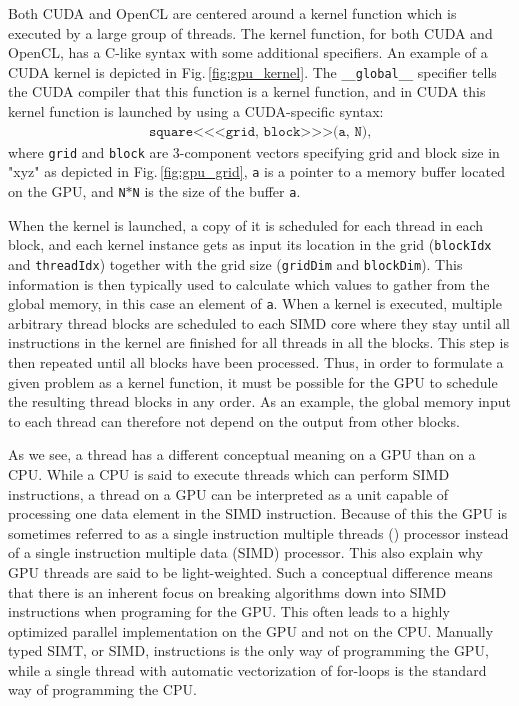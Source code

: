 Both CUDA and OpenCL are centered around a kernel function which is executed by a large group of threads. The kernel function, for both CUDA and OpenCL, has a C-like syntax with some additional specifiers. An example of a CUDA kernel is depicted in Fig.\,\ref{fig:gpu_kernel}. The \texttt{\_\_global\_\_} specifier tells the CUDA compiler that this function is a kernel function, and in CUDA this kernel function is launched by using a CUDA-specific syntax:
\begin{align*}
\texttt{square<<<grid, block>>>(a, N)},
\end{align*}
where \texttt{grid} and \texttt{block} are 3-component vectors specifying grid and block size in "xyz" as depicted in Fig.\,\ref{fig:gpu_grid}, \texttt{a} is a pointer to a memory buffer located on the GPU, and \texttt{N}$*$\texttt{N} is the size of the buffer \texttt{a}. 

When the kernel is launched, a copy of it is scheduled for each thread in each block, and each kernel instance gets as input its location in the grid (\texttt{blockIdx} and \texttt{threadIdx}) together with the grid size (\texttt{gridDim} and \texttt{blockDim}). This information is then typically used to calculate which values to gather from the global memory, in this case an element of \texttt{a}. %
When a kernel is executed, multiple arbitrary thread blocks are scheduled to each SIMD core where they stay until all instructions in the kernel are finished for all threads in all the blocks. This step is then repeated until all blocks have been processed. Thus,  in order to formulate a given problem as a kernel function, it must be possible for the GPU to schedule the resulting thread blocks in any order. As an example, the global memory input to each thread can therefore not depend on the output from other blocks.

As we see, a thread has a different conceptual meaning on a GPU than on a CPU.  While a CPU is said to execute threads which can perform SIMD instructions, a thread on a GPU can be interpreted as a unit capable of processing one data element in the SIMD instruction. Because of this the GPU is sometimes referred to as a single instruction multiple threads () processor instead of a single instruction multiple data (SIMD) processor. This also explain why GPU threads are said to be light-weighted. Such a conceptual difference means that there is an inherent focus on breaking algorithms down into SIMD instructions when programing for the GPU. This often leads to a highly optimized parallel implementation on the GPU and not on the CPU. Manually typed SIMT, or SIMD, instructions is the only way of programming the GPU, while a single thread with automatic vectorization of for-loops is the standard way of programming the CPU. 

